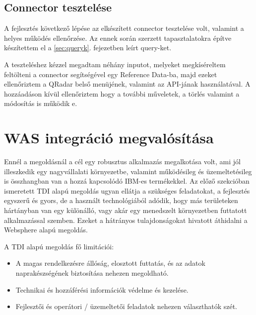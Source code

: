 \subsection{Connector tesztelése}
A fejlesztés következő lépése az elkészített connector tesztelése volt, valamint a helyes működés ellenőrzése. Az ennek során szerzett tapasztalatokra építve készítettem el a \ref{sec:queryk}.  fejezetben leírt query-ket.

A teszteléshez kézzel megadtam néhány inputot, melyeket megkíséreltem feltölteni a connector segítségével egy Reference Data-ba, majd ezeket ellenőriztem a QRadar belső menüjének, valamint az API-jának használatával. 
A hozzáadáson kívül ellenőriztem hogy a további műveletek, a törlés valamint a módosítás is működik e.
\section{WAS integráció megvalósítása}

Ennél a megoldásnál a cél egy robusztus alkalmazás megalkotása volt, ami jól illeszkedik egy nagyvállalati környezetbe, valamint működésileg és üzemeltetésileg is összhangban van a hozzá kapcsolódó IBM-es termékekkel. Az előző szekcióban ismeretett TDI alapú megoldás ugyan ellátja a szükséges feladatokat, a fejlesztés egyszerű és gyors, de a használt technológiából adódik, hogy más területeken hártányban van egy különálló, vagy akár egy menedszelt környezetben futtatott alkalmazással szemben. Ezeket a hátrányos tulajdonságokat hivatott áthidalni a Websphere alapú megoldás.

A TDI alapú megoldás fő limitációi:
\begin{itemize}	
	\item A magas rendelkezésre állóság, elosztott futtatás, és az adatok naprakészségének biztosítása nehezen megoldható.
	
	\item Technikai és hozzáférési információk védelme és kezelése.
	
	\item Fejlesztői és operátori / üzemeltetői feladatok nehezen választhatók szét.
	
\end{itemize}


